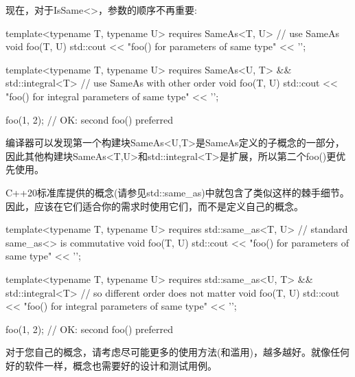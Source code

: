 现在，对于IsSame<>，参数的顺序不再重要:

\begin{cpp}
template<typename T, typename U>
requires SameAs<T, U> // use SameAs
void foo(T, U)
{
	std::cout << "foo() for parameters of same type" << '\n';
}

template<typename T, typename U>
requires SameAs<U, T> && std::integral<T> // use SameAs with other order
void foo(T, U)
{
	std::cout << "foo() for integral parameters of same type" << '\n';
}

foo(1, 2); // OK: second foo() preferred
\end{cpp}

编译器可以发现第一个构建块SameAs<U,T>是SameAs定义的子概念的一部分，因此其他构建块SameAs<T,U>和std::integral<T>是扩展，所以第二个foo()更优先使用。

C++20标准库提供的概念(请参见std::same\_as)中就包含了类似这样的棘手细节。因此，应该在它们适合你的需求时使用它们，而不是定义自己的概念。

\begin{cpp}
template<typename T, typename U>
requires std::same_as<T, U> // standard same_as<> is commutative
void foo(T, U)
{
	std::cout << "foo() for parameters of same type" << '\n';
}

template<typename T, typename U>
requires std::same_as<U, T> && std::integral<T> // so different order does not matter
void foo(T, U)
{
	std::cout << "foo() for integral parameters of same type" << '\n';
}

foo(1, 2); // OK: second foo() preferred
\end{cpp}

对于您自己的概念，请考虑尽可能更多的使用方法(和滥用)，越多越好。就像任何好的软件一样，概念也需要好的设计和测试用例。












